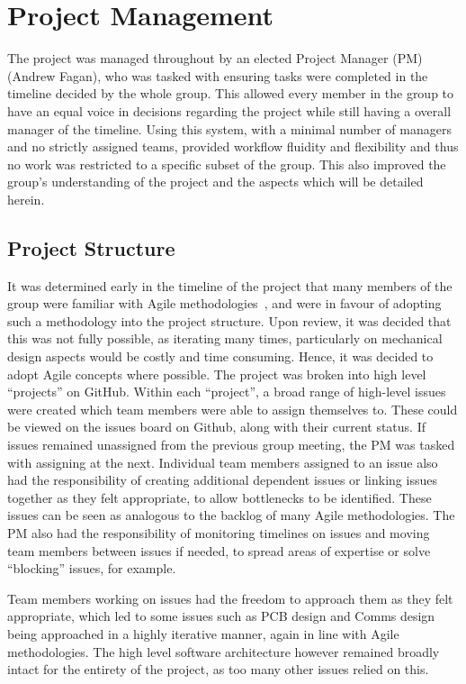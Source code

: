\chapter{Project Management}\label{pm}

The project was managed throughout by an elected Project Manager (PM)
(Andrew Fagan), who was tasked with ensuring tasks were
completed in the timeline decided by the whole group. This
allowed every member in the group to have an equal voice in
decisions regarding the project while still having a overall
manager of the timeline. Using this system, with a minimal
number of managers and no strictly assigned teams, provided
workflow fluidity and flexibility and thus no work was restricted
to a specific subset of the group. This also improved the
group's understanding of the project and the aspects
which will be detailed herein.

\section{Project Structure}\label{pm/structure}

It was determined early in the timeline of the project that many members of the
group were familiar with Agile methodologies~\cite{agilemeth}, and were in favour of
adopting such a methodology into the project structure. Upon review, it was
decided that this was not fully possible, as iterating many times, particularly on
mechanical design aspects would be costly and time consuming. Hence, it was
decided to adopt Agile concepts where possible. The project was broken into high
level ``projects'' on GitHub. Within each ``project'', a broad range of high-level
issues were created which team members were able to assign themselves to. These could 
be viewed on the issues board on Github, along with their current status. If
issues remained unassigned from the previous group meeting, the PM was tasked with
assigning at the next. Individual team members assigned to an issue also had the
responsibility of creating additional dependent issues or linking issues together
as they felt appropriate, to allow bottlenecks to be identified. These issues can
be seen as analogous to the backlog of many Agile methodologies. The PM also had
the responsibility of monitoring timelines on issues and moving team members
between issues if needed, to spread areas of expertise or solve ``blocking''
issues, for example.

Team members working on issues had the freedom to approach them as they felt
appropriate, which led to some issues such as PCB design and Comms design being
approached in a highly iterative manner, again in line with Agile methodologies.
The high level software architecture however remained broadly intact for the
entirety of the project, as too many other issues relied on this.

